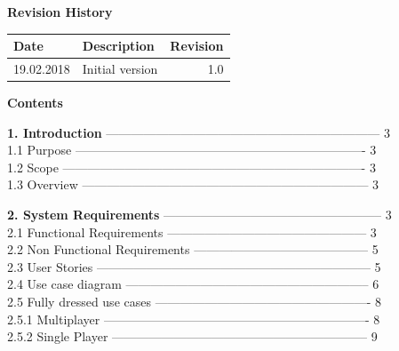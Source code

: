 \documentclass{article}
\begin{document}
	\begin{flushleft}
\textbf{Revision History}\\
\begin{tabular}{|l|l|r|}
	\hline
	Date\hspace{2cm} & Description\hspace{5cm} & Revision \\
	\hline
	19.02.2018 & Initial version & 1.0 \\
	\hline

	\end{tabular}
\newpage

\begin{Large}\textbf{Contents}\\
\end{Large}
\vspace{5mm}
\textbf{1.	Introduction}  ------------------------------------------------------------------  	 3\\
1.1	\hspace{0.5cm}Purpose  ----------------------------------------------------------------------	 3\\
1.2	\hspace{0.5cm}Scope  -------------------------------------------------------------------------	 3\\
1.3	\hspace{0.5cm}Overview  ---------------------------------------------------------------------	 3\\
\vspace{3mm}

\textbf{2.	System Requirements}  -----------------------------------------------------	 3   \\
2.1	\hspace{0.5cm}Functional Requirements  ------------------------------------------------	 3\\
2.2	\hspace{0.5cm}Non Functional Requirements  ------------------------------------------	 5\\
2.3	\hspace{0.5cm}User Stories  ------------------------------------------------------------------   5\\
2.4	\hspace{0.5cm}Use case diagram  -----------------------------------------------------------	 6\\
2.5	\hspace{0.5cm}Fully dressed use cases  ----------------------------------------------------	8\\
\hspace{0.5cm}2.5.1	Multiplayer  ----------------------------------------------------------------	8\\
\hspace{0.5cm}2.5.2	Single Player  --------------------------------------------------------------	9\\
\vspace{3mm}



\end{flushleft}
\end{document}
